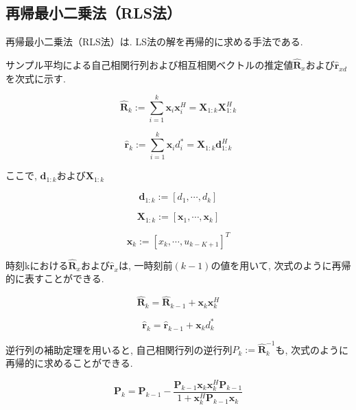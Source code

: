 \subsection{再帰最小二乗法（RLS法）}\label{rls}

再帰最小二乗法（RLS法）は. LS法の解を再帰的に求める手法である. 

サンプル平均による自己相関行列および相互相関ベクトルの推定値\(\hat{\bm{R}}_x\)および\(\hat{\bm{r}}_{xd}\)を次式に示す. 

\begin{equation}
\hat{\bm{R}}_k := \sum_{i=1}^k \bm{x}_i \bm{x}_i^H = \bm{X}_{1:k} \bm{X}_{1:k}^H
\end{equation}

\begin{equation}
\hat{\bm{r}}_k := \sum_{i=1}^k \bm{x}_i d_i^* = \bm{X}_{1:k} \bm{d}_{1:k}^H
\end{equation}

ここで, \(\bm{d}_{1:k}\)および\(\bm{X}_{1:k}\)

\begin{equation}
\bm{d}_{1:k} := [d_1, \cdots, d_k]
\end{equation}

\begin{equation}
\bm{X}_{1:k} := [\bm{x}_1, \cdots, \bm{x}_k]
\end{equation}

\begin{equation}
\bm{x}_{k} := [x_k, \cdots, u_{k-K+1}]^T
\end{equation}

時刻kにおける\(\hat{\bm{R}}_x\)および\(\hat{\bm{r}}_x\)は, 一時刻前\((k-1)\)の値を用いて, 次式のように再帰的に表すことができる. 


\begin{equation}
\hat{\bm{R}}_k = \hat{\bm{R}}_{k-1} + \bm{x}_k \bm{x}_k^H
\end{equation}


\begin{equation}
\hat{\bm{r}}_k = \hat{\bm{r}}_{k-1} + \bm{x}_k d_k^*
\label{equ:hat_r}
\end{equation}

逆行列の補助定理を用いると, 自己相関行列の逆行列\(P_k := \hat{\bm{R}}_k^{-1}\)も, 次式のように再帰的に求めることができる. 


\begin{equation}
\bm{P}_k = \bm{P}_{k-1} - \frac{\bm{P}_{k-1} \bm{x}_k \bm{x}_k^H \bm{P}_{k-1}}{1 + \bm{x}_k^H \bm{P}_{k-1} \bm{x}_k} 
\label{equ:P_k_inv_R}
\end{equation}

